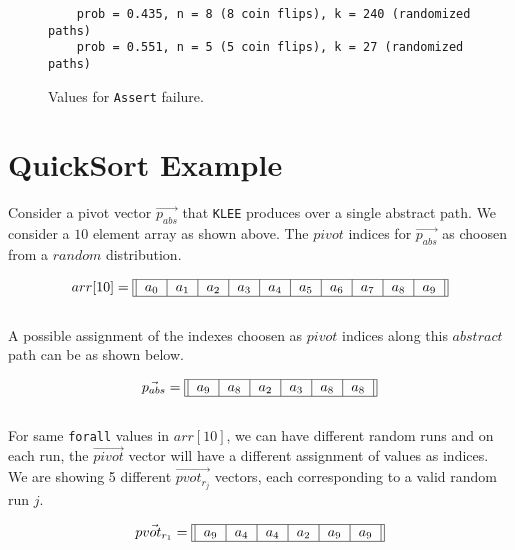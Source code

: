 \documentclass[usenames,dvipsnames,acmsmall]{acmart}
\begin{document}
\begin{figure}
	\begin{verbatim}
	prob = 0.435, n = 8 (8 coin flips), k = 240 (randomized paths)
	prob = 0.551, n = 5 (5 coin flips), k = 27 (randomized paths) 
	\end{verbatim}
	\caption{Values for \texttt{Assert} failure.}
\end{figure}

\section{QuickSort Example}

Consider a pivot vector $\vec{p_{abs}}$ that \texttt{KLEE} produces over a single abstract path. We consider a $10$ element array as shown above. The $pivot$ indices for $\vec{p_{abs}}$ as choosen from a $random$ distribution.

\begin{equation}
	arr[10] = \begin{tabular}{||c|c|c|c|c|c|c|c|c|c||}
		\hline
		$a_0$ & $a_1$ & $a_2$ & $a_3$ & $a_4$ & $a_5$ & $a_6$ & $a_7$ & $a_8$ & $a_9$ \\
		\hline
	\end{tabular}
\end{equation} \\

A possible assignment of the indexes choosen as $pivot$ indices along this $abstract$ path can be as shown below.

\begin{equation}
	\vec{p_{abs}} = \begin{tabular}{||c|c|c|c|c|c||}
		\hline
		$a_9$ & $a_8$ & $a_2$ & $a_3$ & $a_8$ & $a_8$ \\
		\hline
	\end{tabular}
\end{equation} \\

For same \texttt{forall} values in $arr[10]$, we can have different random runs and on each run, the $\vec{pivot}$ vector will have a different assignment of values as indices. We are showing 5 different $\vec{pvot_{r_{j}}}$ vectors, each corresponding to a valid random run $j$.

\begin{equation}
	\vec{pvot_{r_{1}}} = \begin{tabular}{||c|c|c|c|c|c||}
		\hline
		$a_9$ & $a_4$ & $a_4$ & $a_2$ & $a_9$ & $a_9$ \\
		\hline
	\end{tabular}
\end{equation} 
\end{document}
